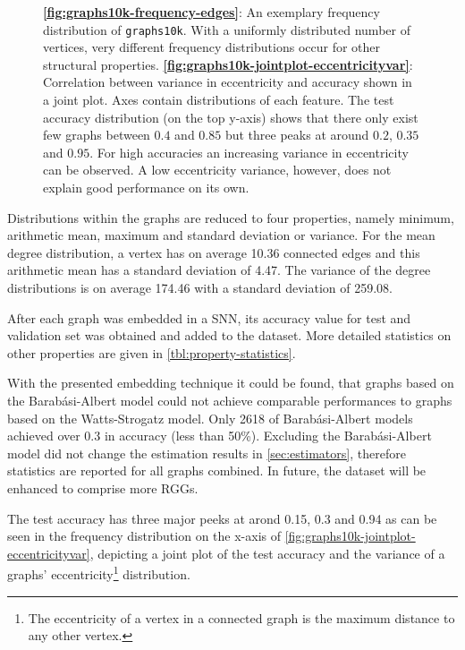 \documentclass[runningheads]{llncs}
\newcommand{\imagePath}{./}
\begin{document}
\begin{figure}[tb]
	\hfill
	\caption{\textbf{\autoref{fig:graphs10k-frequency-edges}}: An exemplary frequency distribution of \texttt{graphs10k}.
		With a uniformly distributed number of vertices, very different frequency distributions occur for other structural properties.
		\textbf{\autoref{fig:graphs10k-jointplot-eccentricityvar}}: Correlation between variance in eccentricity and accuracy shown in a joint plot.
		Axes contain distributions of each feature.
		The test accuracy distribution (on the top y-axis) shows that there only exist few graphs between $0.4$ and $0.85$ but three peaks at around $0.2$, $0.35$ and $0.95$.
		For high accuracies an increasing variance in eccentricity can be observed.
		A low eccentricity variance, however, does not explain good performance on its own.}
\end{figure}

Distributions within the graphs are reduced to four properties, namely minimum, arithmetic mean, maximum and standard deviation or variance.
For the mean degree distribution, a vertex has on average 10.36 connected edges and this arithmetic mean has a standard deviation of 4.47.
The variance of the degree distributions is on average 174.46 with a standard deviation of 259.08.

After each graph was embedded in a SNN, its accuracy value for test and validation set was obtained and added to the dataset.
More detailed statistics on other properties are given in \autoref{tbl:property-statistics}.

With the presented embedding technique it could be found, that graphs based on the Barabási-Albert model could not achieve comparable performances to graphs based on the Watts-Strogatz model.
Only 2618 of Barabási-Albert models achieved over 0.3 in accuracy (less than 50\%).
Excluding the Barabási-Albert model did not change the estimation results in \autoref{sec:estimators}, therefore statistics are reported for all graphs combined.
In future, the dataset will be enhanced to comprise more RGGs.

The test accuracy has three major peeks at arond 0.15, 0.3 and 0.94 as can be seen in the frequency distribution on the x-axis of \autoref{fig:graphs10k-jointplot-eccentricityvar}, depicting a joint plot of the test accuracy and the variance of a graphs' eccentricity\footnote{The eccentricity of a vertex in a connected graph is the maximum distance to any other vertex.} distribution.
\end{document}
